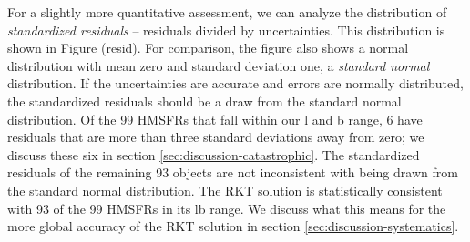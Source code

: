 For a slightly more quantitative assessment, we can analyze the distribution of \emph{standardized residuals} -- residuals divided by uncertainties. This distribution is shown in Figure (resid). For comparison, the figure also shows a normal distribution with mean zero and standard deviation one, a \emph{standard normal} distribution. If the uncertainties are accurate and errors are normally distributed, the standardized residuals should be a draw from the standard normal distribution. Of the 99 HMSFRs that fall within our l and b range, 6 have residuals that are more than three standard deviations away from zero; we discuss these six in section \ref{sec:discussion-catastrophic}. The standardized residuals of the remaining 93 objects are not inconsistent with being drawn from the standard normal distribution. The RKT solution is statistically consistent with 93 of the 99 HMSFRs in its lb range. We discuss what this means for the more global accuracy of the RKT solution in section \ref{sec:discussion-systematics}. 